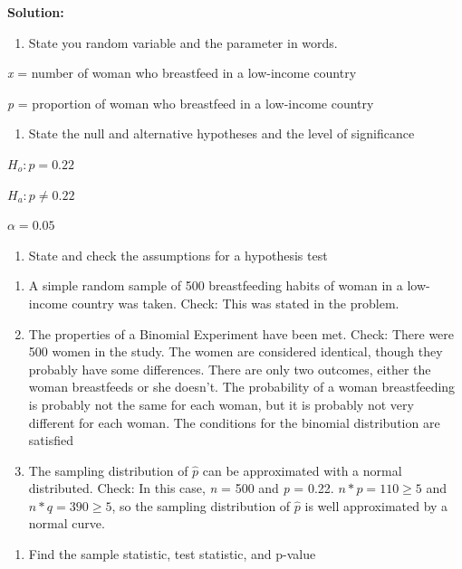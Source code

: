 \documentclass[]{book}
\providecommand{\tightlist}{%
  \setlength{\itemsep}{0pt}\setlength{\parskip}{0pt}}
\begin{document}
\textbf{Solution:}

\begin{enumerate}
\def\labelenumi{\arabic{enumi}.}
\tightlist
\item
  State you random variable and the parameter in words.
\end{enumerate}

\emph{x} = number of woman who breastfeed in a low-income country

\emph{p} = proportion of woman who breastfeed in a low-income country

\begin{enumerate}
\def\labelenumi{\arabic{enumi}.}
\setcounter{enumi}{1}
\tightlist
\item
  State the null and alternative hypotheses and the level of significance
\end{enumerate}

\(H_o:p=0.22\)

\(H_a:p\ne0.22\)

\(\alpha=0.05\)

\begin{enumerate}
\def\labelenumi{\arabic{enumi}.}
\setcounter{enumi}{2}
\tightlist
\item
  State and check the assumptions for a hypothesis test
\end{enumerate}

\begin{enumerate}
\def\labelenumi{\alph{enumi}.}
\item
  A simple random sample of 500 breastfeeding habits of woman in a low-income country was taken. Check: This was stated in the problem.
\item
  The properties of a Binomial Experiment have been met. Check: There were 500 women in the study. The women are considered identical, though they probably have some differences. There are only two outcomes, either the woman breastfeeds or she doesn't. The probability of a woman breastfeeding is probably not the same for each woman, but it is probably not very different for each woman. The conditions for the binomial distribution are satisfied
\item
  The sampling distribution of \(\hat{p}\) can be approximated with a normal distributed. Check: In this case, \emph{n} = 500 and \emph{p} = 0.22. \(n*p= 110\ge5\) and \(n*q=390\ge5\), so the sampling distribution of \(\hat{p}\) is well approximated by a normal curve.
\end{enumerate}

\begin{enumerate}
\def\labelenumi{\arabic{enumi}.}
\setcounter{enumi}{3}
\tightlist
\item
  Find the sample statistic, test statistic, and p-value
\end{enumerate}
\end{document}

